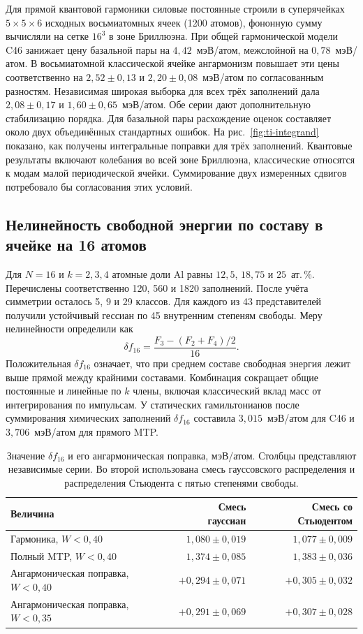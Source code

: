 Для прямой квантовой гармоники силовые постоянные строили в суперячейках
$5\times5\times6$ исходных восьмиатомных ячеек (1200 атомов), фононную
сумму вычисляли на сетке $16^3$ в зоне Бриллюэна. При общей гармонической
модели C46 занижает цену базальной пары на $4{,}42$~мэВ/атом, межслойной
на $0{,}78$~мэВ/атом. В восьмиатомной классической ячейке ангармонизм
повышает эти цены соответственно на $2{,}52\pm0{,}13$ и
$2{,}20\pm0{,}08$~мэВ/атом по согласованным разностям. Независимая широкая
выборка для всех трёх заполнений дала $2{,}08\pm0{,}17$ и
$1{,}60\pm0{,}65$~мэВ/атом. Обе серии дают дополнительную стабилизацию порядка.
Для базальной пары расхождение оценок составляет около двух объединённых
стандартных ошибок. На рис.~\ref{fig:ti-integrand} показано, как
получены интегральные поправки для трёх заполнений. Квантовые результаты включают колебания во всей зоне
Бриллюэна, классические относятся к модам малой периодической ячейки.
Суммирование двух измеренных сдвигов потребовало бы согласования этих условий.

\subsection{Нелинейность свободной энергии по составу в ячейке на 16 атомов}

Для $N=16$ и $k=2,3,4$ атомные доли Al равны $12{,}5$, $18{,}75$ и
$25$~ат.\,\%. Перечислены соответственно 120, 560 и 1820 заполнений. После
учёта симметрии осталось 5, 9 и 29 классов. Для каждого из 43 представителей
получили устойчивый гессиан по 45 внутренним степеням свободы. Меру
нелинейности определили как
\[
 \delta f_{16}=\frac{F_3-(F_2+F_4)/2}{16}.
\]
Положительная $\delta f_{16}$ означает, что при среднем составе свободная
энергия лежит выше прямой между крайними составами. Комбинация сокращает
общие постоянные и линейные по $k$ члены, включая классический вклад масс
от интегрирования по импульсам. У статических гамильтонианов после
суммирования химических заполнений $\delta f_{16}$ составила
$3{,}015$~мэВ/атом для C46 и $3{,}706$~мэВ/атом для прямого MTP.

\begin{table}[htbp]
\centering\small
\caption{Значение $\delta f_{16}$ и его ангармоническая поправка, мэВ/атом.
Столбцы представляют независимые серии. Во второй использована смесь
гауссовского распределения и распределения Стьюдента с пятью степенями свободы.}
\label{tab:small16}
\begin{tabular}{@{}lrr@{}}
\hline
Величина & Смесь гауссиан & Смесь со Стьюдентом\\
\hline
Гармоника, $W<0{,}40$ & $1{,}080\pm0{,}019$ & $1{,}077\pm0{,}009$\\
Полный MTP, $W<0{,}40$ & $1{,}374\pm0{,}085$ & $1{,}383\pm0{,}036$\\
Ангармоническая поправка, $W<0{,}40$ & $+0{,}294\pm0{,}071$ & $+0{,}305\pm0{,}032$\\
Ангармоническая поправка, $W<0{,}35$ & $+0{,}291\pm0{,}069$ & $+0{,}307\pm0{,}028$\\
\hline
\end{tabular}
\end{table}

